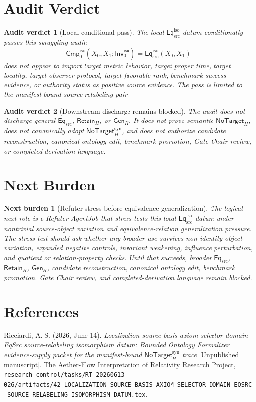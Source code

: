 \documentclass[11pt]{article}
\newcommand{\Inv}{\mathsf{Inv}_{0}^{\mathrm{iso}}}
\newcommand{\Cmp}{\mathsf{Cmp}_{0}^{\mathrm{iso}}}
\newcommand{\EqSrc}{\mathsf{Eq}_{\mathrm{src}}}
\newcommand{\EqIso}{\mathsf{Eq}_{\mathrm{src}}^{\mathrm{iso}}}
\newcommand{\GenH}{\mathsf{Gen}_{H}}
\newcommand{\RetainH}{\mathsf{Retain}_{H}}
\newcommand{\NoTargetH}{\mathsf{NoTarget}_{H}}
\newcommand{\NoTargetSyn}{\mathsf{NoTarget}_{H}^{\mathrm{syn}}}
\newtheorem{auditverdict}{Audit verdict}
\newtheorem{nextburden}{Next burden}
\begin{document}
\section{Audit Verdict}

\begin{auditverdict}[Local conditional pass]
The local \(\EqIso\) datum conditionally passes this smuggling audit:
\[
    \Cmp(X_{0},X_{1};\Inv)=\EqIso(X_{0},X_{1})
\]
does not appear to import target metric behavior, target proper time,
target locality, target observer protocol, target-favorable rank,
benchmark-success evidence, or authority status as positive source
evidence. The pass is limited to the manifest-bound source-relabeling
pair.
\end{auditverdict}

\begin{auditverdict}[Downstream discharge remains blocked]
The audit does not discharge general \(\EqSrc\), \(\RetainH\), or
\(\GenH\). It does not prove semantic \(\NoTargetH\), does not canonically
adopt \(\NoTargetSyn\), and does not authorize candidate reconstruction,
canonical ontology edit, benchmark promotion, Gate Chair review, or
completed-derivation language.
\end{auditverdict}

\section{Next Burden}

\begin{nextburden}[Refuter stress before equivalence generalization]
The logical next role is a Refuter AgentJob that stress-tests this local
\(\EqIso\) datum under nontrivial source-object variation and
equivalence-relation generalization pressure. The stress test should ask
whether any broader use survives non-identity object variation, expanded
negative controls, invariant weakening, influence perturbation, and
quotient or relation-property checks. Until that succeeds, broader
\(\EqSrc\), \(\RetainH\), \(\GenH\), candidate reconstruction, canonical
ontology edit, benchmark promotion, Gate Chair review, and
completed-derivation language remain blocked.
\end{nextburden}

\section*{References}

Ricciardi, A. S. (2026, June 14). \emph{Localization source-basis axiom
selector-domain EqSrc source-relabeling isomorphism datum: Bounded
Ontology Formalizer evidence-supply packet for the manifest-bound
\(\NoTargetSyn\) trace} [Unpublished manuscript]. The Aether-Flow
Interpretation of Relativity Research Project,
\texttt{research\_control/tasks/RT-20260613-026/artifacts/42\_LOCALIZATION\_SOURCE\_BASIS\_AXIOM\_SELECTOR\_DOMAIN\_EQSRC\_SOURCE\_RELABELING\_ISOMORPHISM\_DATUM.tex}.
\end{document}
